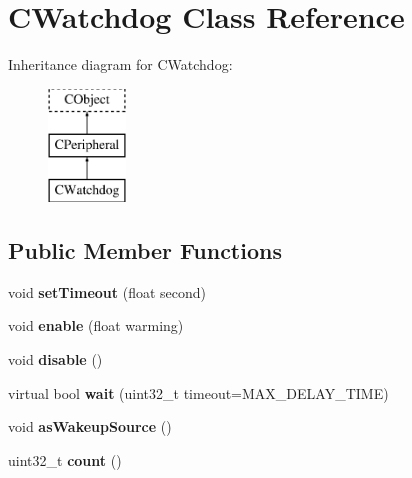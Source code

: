 \hypertarget{class_c_watchdog}{\section{C\-Watchdog Class Reference}
\label{class_c_watchdog}
}
Inheritance diagram for C\-Watchdog\-:\begin{figure}[H]
\begin{center}
\leavevmode
\includegraphics[height=3.000000cm]{class_c_watchdog}
\end{center}
\end{figure}
\subsection*{Public Member Functions}
\begin{DoxyCompactItemize}
\item 
\hypertarget{class_c_watchdog_af9dc7eb09403e54c36ffce01e1932f1e}{void {\bfseries set\-Timeout} (float second)}\label{class_c_watchdog_af9dc7eb09403e54c36ffce01e1932f1e}

\item 
\hypertarget{class_c_watchdog_afbc1961aa586367e2bfaf36388bdbccb}{void {\bfseries enable} (float warming)}\label{class_c_watchdog_afbc1961aa586367e2bfaf36388bdbccb}

\item 
\hypertarget{class_c_watchdog_a7b59eeaca4965e03559e327131d76979}{void {\bfseries disable} ()}\label{class_c_watchdog_a7b59eeaca4965e03559e327131d76979}

\item 
\hypertarget{class_c_watchdog_a252da476793090998b1086c99bbbd1ab}{virtual bool {\bfseries wait} (uint32\-\_\-t timeout=M\-A\-X\-\_\-\-D\-E\-L\-A\-Y\-\_\-\-T\-I\-M\-E)}\label{class_c_watchdog_a252da476793090998b1086c99bbbd1ab}

\item 
\hypertarget{class_c_watchdog_ae0b02e76a4c9e853aec3d5526dd33963}{void {\bfseries as\-Wakeup\-Source} ()}\label{class_c_watchdog_ae0b02e76a4c9e853aec3d5526dd33963}

\item 
\hypertarget{class_c_watchdog_ac6c20aa855ac46780e63de1f745c4d6b}{uint32\-\_\-t {\bfseries count} ()}\label{class_c_watchdog_ac6c20aa855ac46780e63de1f745c4d6b}

\end{DoxyCompactItemize}
